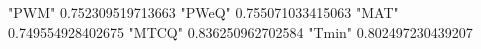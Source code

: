 "PWM" 0.752309519713663
"PWeQ" 0.755071033415063
"MAT" 0.749554928402675
"MTCQ" 0.836250962702584
"Tmin" 0.802497230439207
